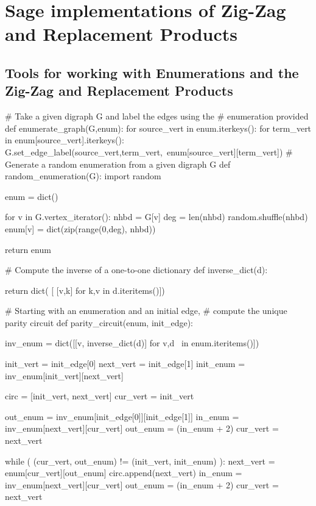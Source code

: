 \appendices
%
%

\chapter{Sage implementations of Zig-Zag and Replacement Products}
\section{Tools for working with Enumerations and the Zig-Zag and Replacement Products}
\label{app:enum}
\begin{sageblock}

# Take a given digraph G and label the edges using the 
# enumeration provided
def enumerate_graph(G,enum):
     for source_vert in enum.iterkeys():
         for term_vert in enum[source_vert].iterkeys():
             G.set_edge_label(source_vert,term_vert,\
             enum[source_vert][term_vert])
# Generate a random enumeration from a given digraph G
def random_enumeration(G):
    import random

    enum = dict()

    for v in G.vertex_iterator():
        nhbd = G[v]
        deg = len(nhbd)
        random.shuffle(nhbd)
        enum[v] = dict(zip(range(0,deg), nhbd))

    return enum

# Compute the inverse of a one-to-one dictionary
def inverse_dict(d):

    return dict( [ [v,k] for k,v in d.iteritems()])

# Starting with an enumeration and an initial edge, 
# compute the unique parity circuit
def parity_circuit(enum, init_edge):
    
    inv_enum = dict([[v, inverse_dict(d)] for v,d \
    in enum.iteritems()])
    
    init_vert = init_edge[0]
    next_vert = init_edge[1]
    init_enum = inv_enum[init_vert][next_vert]

    circ = [init_vert, next_vert]
    cur_vert = init_vert


    out_enum = inv_enum[init_edge[0]][init_edge[1]]
    in_enum = inv_enum[next_vert][cur_vert]
    out_enum = (in_enum + 2)%
    cur_vert = next_vert

    
    while ( (cur_vert, out_enum) != (init_vert, init_enum) ):
        next_vert = enum[cur_vert][out_enum]
        circ.append(next_vert)
        in_enum = inv_enum[next_vert][cur_vert]
        out_enum = (in_enum + 2)%
        cur_vert = next_vert
        

\end{sageblock}
